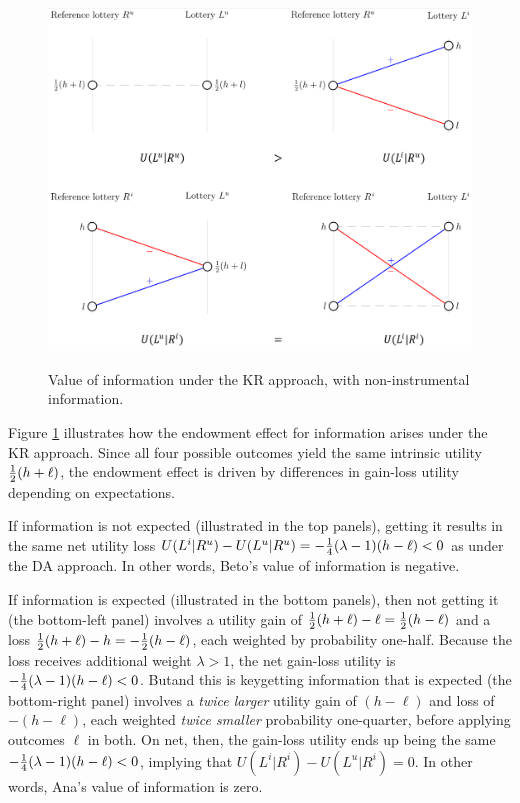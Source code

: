 \begin{figure}[ht]
  \caption{Value of information under the KR approach, with non-instrumental information.}\label{fig:nonInstrumental-KR}
  \begin{center}
  {\includegraphics[width=1\textwidth]{./figures/theory_fig2.png}}
  \end{center}
\end{figure}

Figure \ref{fig:nonInstrumental-KR} illustrates how the endowment effect for information arises under the KR approach. Since all four possible outcomes yield the same intrinsic utility $\tfrac{1}{2}(h+\ell)$, the endowment effect is driven by differences in gain-loss utility depending on expectations.

If information is not expected (illustrated in the top panels), getting it results in the same net utility loss $U(L^i|R^u)-U(L^u|R^u)=-\tfrac{1}{4}(\lambda-1)(h-\ell)<0$ as under the DA approach. In other words, Beto's value of information is negative.

If information is expected (illustrated in the bottom panels), then not getting it (the bottom-left panel) involves a utility gain of $\tfrac{1}{2}(h+\ell)-\ell=\tfrac{1}{2}(h-\ell)$ and a loss $\tfrac{1}{2}(h+\ell)-h=-\tfrac{1}{2}(h-\ell)$, each weighted by probability one-half. Because the loss receives additional weight $\lambda>1$, the net gain-loss utility is $-\tfrac{1}{4}(\lambda-1)(h-\ell)<0$. But\textemdash and this is key\textemdash getting information that is expected (the bottom-right panel) involves a \emph{twice larger} utility gain of $(h-\ell)$ and loss of $-(h-\ell)$, each weighted \emph{twice smaller} probability one-quarter, before applying outcomes $\ell$ in both. On net, then, the gain-loss utility ends up being the same $-\tfrac{1}{4}(\lambda-1)(h-\ell)<0$, implying that $U(L^i|R^i)-U(L^u|R^i)=0$. In other words, Ana's value of information is zero.

